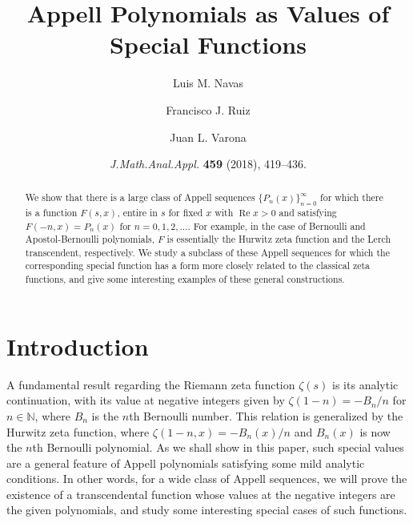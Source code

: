 \documentclass[11pt,a4paper]{amsart}
\title[Appell Polynomials as Special Functions]%
{Appell Polynomials as Values of Special Functions}
\author[L.~M.~Navas]{Luis M. Navas}
\author[F.~J.~Ruiz]{Francisco J. Ruiz}
\author[J.~L.~Varona]{Juan L. Varona}
\date{\textit{J.\@ Math.\@ Anal.\@ Appl.\@} \textbf{459} (2018), 419--436.}
\newcommand{\N}{\mathbb{N}}
\renewcommand{\Re}{\operatorname{Re}}
\theoremstyle{plain}
\theoremstyle{plain}
\theoremstyle{definition}
\theoremstyle{remark}
\begin{document}

\begin{abstract}
We show that there is a large class of Appell sequences $\{P_{n}(x)\}_{n=0}^{\infty}$ for which there is a function $F(s,x)$, entire in $s$ for fixed $x$ with $\Re x > 0$ and satisfying $F(-n,x) = P_{n}(x)$ for $n=0,1,2,\dots$. For example, in the case of Bernoulli and Apostol-Bernoulli polynomials, $F$ is essentially the Hurwitz zeta function and the Lerch transcendent, respectively. We study a subclass of these Appell sequences for which the corresponding special function has a form more closely related to the classical zeta functions, and give some interesting examples of these general constructions.
\end{abstract}

\maketitle


\section{Introduction}


A fundamental result regarding the Riemann zeta function $\zeta(s)$ is its analytic continuation, with its value at negative integers given by $\zeta(1-n) = - B_{n}/n$ for $n \in \N$, where $B_{n}$ is the $n$th Bernoulli number. This relation is generalized by the Hurwitz zeta function, where $\zeta(1-n,x) = -B_{n}(x)/n$ and $B_{n}(x)$ is now the $n$th Bernoulli polynomial.
As we shall show in this paper, such special values are a general feature of Appell polynomials satisfying some mild analytic conditions. In other words, for a wide class of Appell sequences, we will prove the existence of a transcendental function whose values at the negative integers are the given polynomials, and study some interesting special cases of such functions.
\end{document}
